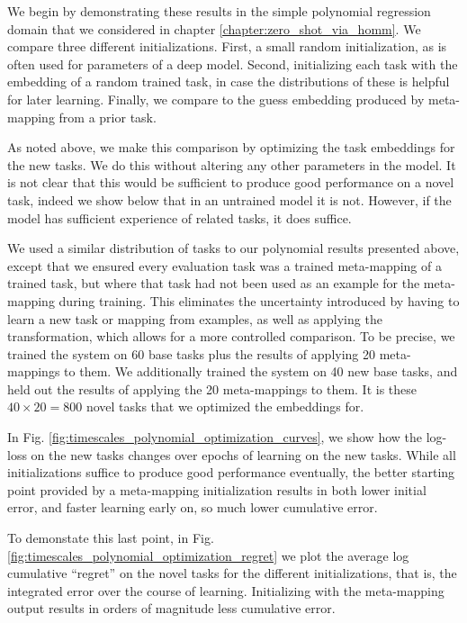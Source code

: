 We begin by demonstrating these results in the simple polynomial regression domain that we considered in chapter \ref{chapter:zero_shot_via_homm}. We compare three different initializations. First, a small random initialization, as is often used for parameters of a deep model. Second, initializing each task with the embedding of a random trained task, in case the distributions of these is helpful for later learning. Finally, we compare to the guess embedding produced by meta-mapping from a prior task. \par 
As noted above, we make this comparison by optimizing the task embeddings for the new tasks. We do this without altering any other parameters in the model. It is not clear that this would be sufficient to produce good performance on a novel task, indeed we show below that in an untrained model it is not. However, if the model has sufficient experience of related tasks, it does suffice. \par 
We used a similar distribution of tasks to our polynomial results presented above, except that we ensured every evaluation task was a trained meta-mapping of a trained task, but where that task had not been used as an example for the meta-mapping during training. This eliminates the uncertainty introduced by having to learn a new task or mapping from examples, as well as applying the transformation, which allows for a more controlled comparison. To be precise, we trained the system on 60 base tasks plus the results of applying 20 meta-mappings to them. We additionally trained the system on 40 new base tasks, and held out the results of applying the 20 meta-mappings to them. It is these \(40 \times 20 = 800\) novel tasks that we optimized the embeddings for. \par 
In Fig. \ref{fig:timescales_polynomial_optimization_curves}, we show how the log-loss on the new tasks changes over epochs of learning on the new tasks. While all initializations suffice to produce good performance eventually, the better starting point provided by a meta-mapping initialization results in both lower initial error, and faster learning early on, so much lower cumulative error. \par
To demonstate this last point, in Fig. \ref{fig:timescales_polynomial_optimization_regret} we plot the average log cumulative ``regret'' on the novel tasks for the different initializations, that is, the integrated error over the course of learning. Initializing with the meta-mapping output results in orders of magnitude less cumulative error. \par
